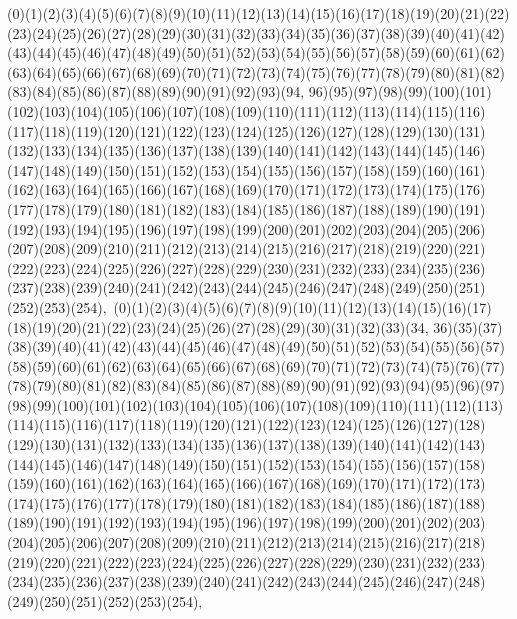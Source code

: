 \documentclass[12pt]{article}
\begin{document}
{(0)(1)(2)(3)(4)(5)(6)(7)(8)(9)(10)(11)(12)(13)(14)(15)(16)(17)(18)(19)(20)(21)(22)(23)(24)(25)(26)(27)(28)(29)(30)(31)(32)(33)(34)(35)(36)(37)(38)(39)(40)(41)(42)(43)(44)(45)(46)(47)(48)(49)(50)(51)(52)(53)(54)(55)(56)(57)(58)(59)(60)(61)(62)(63)(64)(65)(66)(67)(68)(69)(70)(71)(72)(73)(74)(75)(76)(77)(78)(79)(80)(81)(82)(83)(84)(85)(86)(87)(88)(89)(90)(91)(92)(93)(94, 96)(95)(97)(98)(99)(100)(101)(102)(103)(104)(105)(106)(107)(108)(109)(110)(111)(112)(113)(114)(115)(116)(117)(118)(119)(120)(121)(122)(123)(124)(125)(126)(127)(128)(129)(130)(131)(132)(133)(134)(135)(136)(137)(138)(139)(140)(141)(142)(143)(144)(145)(146)(147)(148)(149)(150)(151)(152)(153)(154)(155)(156)(157)(158)(159)(160)(161)(162)(163)(164)(165)(166)(167)(168)(169)(170)(171)(172)(173)(174)(175)(176)(177)(178)(179)(180)(181)(182)(183)(184)(185)(186)(187)(188)(189)(190)(191)(192)(193)(194)(195)(196)(197)(198)(199)(200)(201)(202)(203)(204)(205)(206)(207)(208)(209)(210)(211)(212)(213)(214)(215)(216)(217)(218)(219)(220)(221)(222)(223)(224)(225)(226)(227)(228)(229)(230)(231)(232)(233)(234)(235)(236)(237)(238)(239)(240)(241)(242)(243)(244)(245)(246)(247)(248)(249)(250)(251)(252)(253)(254)$
, 
$
(0)(1)(2)(3)(4)(5)(6)(7)(8)(9)(10)(11)(12)(13)(14)(15)(16)(17)(18)(19)(20)(21)(22)(23)(24)(25)(26)(27)(28)(29)(30)(31)(32)(33)(34, 36)(35)(37)(38)(39)(40)(41)(42)(43)(44)(45)(46)(47)(48)(49)(50)(51)(52)(53)(54)(55)(56)(57)(58)(59)(60)(61)(62)(63)(64)(65)(66)(67)(68)(69)(70)(71)(72)(73)(74)(75)(76)(77)(78)(79)(80)(81)(82)(83)(84)(85)(86)(87)(88)(89)(90)(91)(92)(93)(94)(95)(96)(97)(98)(99)(100)(101)(102)(103)(104)(105)(106)(107)(108)(109)(110)(111)(112)(113)(114)(115)(116)(117)(118)(119)(120)(121)(122)(123)(124)(125)(126)(127)(128)(129)(130)(131)(132)(133)(134)(135)(136)(137)(138)(139)(140)(141)(142)(143)(144)(145)(146)(147)(148)(149)(150)(151)(152)(153)(154)(155)(156)(157)(158)(159)(160)(161)(162)(163)(164)(165)(166)(167)(168)(169)(170)(171)(172)(173)(174)(175)(176)(177)(178)(179)(180)(181)(182)(183)(184)(185)(186)(187)(188)(189)(190)(191)(192)(193)(194)(195)(196)(197)(198)(199)(200)(201)(202)(203)(204)(205)(206)(207)(208)(209)(210)(211)(212)(213)(214)(215)(216)(217)(218)(219)(220)(221)(222)(223)(224)(225)(226)(227)(228)(229)(230)(231)(232)(233)(234)(235)(236)(237)(238)(239)(240)(241)(242)(243)(244)(245)(246)(247)(248)(249)(250)(251)(252)(253)(254)$
, 
$
}
\end{document}
